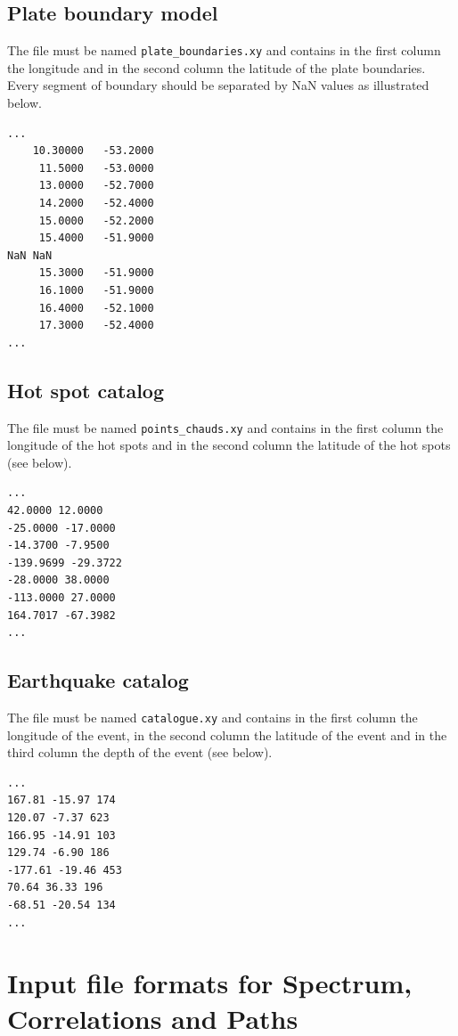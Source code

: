 \documentclass[12pt]{article}
\begin{document}
\subsection{Plate boundary model}

The file must be named \verb|plate_boundaries.xy| and contains in the first column the longitude and in the second column the latitude of the plate boundaries. Every segment of boundary should be separated by NaN values as illustrated below.

\begin{verbatim}
...
    10.30000   -53.2000
     11.5000   -53.0000
     13.0000   -52.7000
     14.2000   -52.4000
     15.0000   -52.2000
     15.4000   -51.9000
NaN NaN
     15.3000   -51.9000
     16.1000   -51.9000
     16.4000   -52.1000
     17.3000   -52.4000
...
\end{verbatim}

\subsection{Hot spot catalog}

The file must be named \verb|points_chauds.xy| and contains in the first column the longitude of the hot spots and in the second column the latitude of the hot spots (see below). 

\begin{verbatim}
...
42.0000 12.0000 
-25.0000 -17.0000 
-14.3700 -7.9500 
-139.9699 -29.3722 
-28.0000 38.0000 
-113.0000 27.0000 
164.7017 -67.3982
...
\end{verbatim}

\subsection{Earthquake catalog}

The file must be named \verb|catalogue.xy| and contains in the first column the longitude of the event, in the second column the latitude of the event and in the third column the depth of the event (see below).

\begin{verbatim}
...
167.81 -15.97 174 
120.07 -7.37 623     
166.95 -14.91 103 
129.74 -6.90 186 
-177.61 -19.46 453        
70.64 36.33 196
-68.51 -20.54 134 
...
\end{verbatim}


\section{Input file formats for Spectrum, Correlations and Paths}\label{format}
\end{document}
